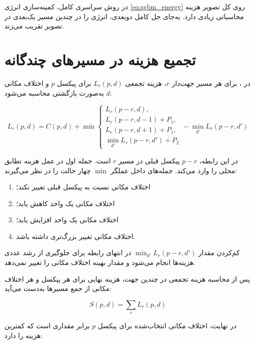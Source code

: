 در روش سراسری کامل، کمینه‌سازی انرژی \eqref{eq:sgbm_energy} روی کل تصویر هزینه محاسباتی زیادی دارد.  به‌جای حل کامل دوبعدی، انرژی را در چندین مسیر یک‌بعدی در تصویر تقریب می‌زند.

\section{تجمیع هزینه در مسیرهای چندگانه}

در ، برای هر مسیر جهت‌دار \(r\)، هزینه تجمعی \(L_r(p,d)\) برای پیکسل \(p\) و اختلاف مکانی \(d\) به‌صورت بازگشتی محاسبه می‌شود:

\begin{equation}
	L_r(p,d)
	=
	C(p,d)
	+
	\min
	\begin{cases}
		L_r(p-r,d),\\
		L_r(p-r,d-1)+P_1,\\
		L_r(p-r,d+1)+P_1,\\
		\min\limits_{d'} L_r(p-r,d') + P_2
	\end{cases}
	-
	\min\limits_{d'} L_r(p-r,d')
	\label{eq:sgbm_path_cost}
\end{equation}

در این رابطه، \(p-r\) پیکسل قبلی در مسیر \(r\) است. جمله اول در عمل هزینه تطابق محلی را وارد می‌کند. جمله‌های داخل عملگر \(\min\) چهار حالت را در نظر می‌گیرند:

\begin{enumerate}
	\item اختلاف مکانی نسبت به پیکسل قبلی تغییر نکند؛
	\item اختلاف مکانی یک واحد کاهش یابد؛
	\item اختلاف مکانی یک واحد افزایش یابد؛
	\item اختلاف مکانی تغییر بزرگ‌تری داشته باشد.
\end{enumerate}

کم‌کردن مقدار \(\min_{d'}L_r(p-r,d')\) در انتهای رابطه برای جلوگیری از رشد عددی هزینه‌ها انجام می‌شود و مقدار بهینه اختلاف مکانی را تغییر نمی‌دهد.

پس از محاسبه هزینه تجمعی در چندین جهت، هزینه نهایی برای هر پیکسل و هر اختلاف مکانی از جمع مسیرها به‌دست می‌آید:

\begin{equation}
	S(p,d)
	=
	\sum_{r}
	L_r(p,d)
	\label{eq:sgbm_total_cost}
\end{equation}

در نهایت، اختلاف مکانی انتخاب‌شده برای پیکسل \(p\) برابر مقداری است که کمترین هزینه را دارد:

